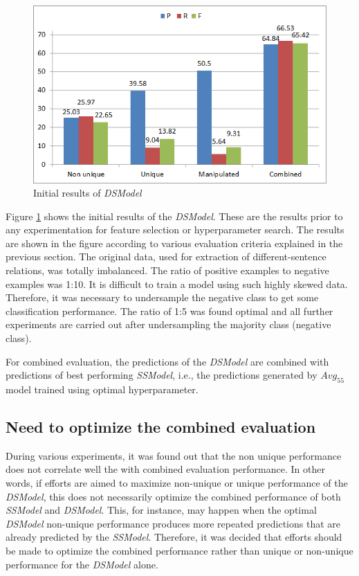 \begin{figure}
\centering
\includegraphics[scale=0.7]{figures/DSInitialResults.png}
\caption{Initial results of \textit{DSModel}}\label{fig:DSInitial}
\end{figure}

Figure \ref{fig:DSInitial} shows the initial results of the \textit{DSModel}. These are the results prior to any experimentation for feature selection or hyperparameter search. The results are shown in the figure according to various evaluation criteria explained in the previous section. The original data, used for extraction of different-sentence relations, was totally imbalanced. The ratio of positive examples to negative examples was 1:10. It is difficult to train a model using such highly skewed data. Therefore, it was necessary to undersample \cite{akbani2004applying} the negative class to get some classification performance. The ratio of 1:5 was found optimal and all further experiments are carried out after undersampling the majority class (negative class).

For combined evaluation, the predictions of the \textit{DSModel} are combined with predictions of best performing \textit{SSModel}, i.e., the predictions generated by $Avg_{55}$ model trained using optimal hyperparameter.

\subsection{Need to optimize the combined evaluation}

During various experiments, it was found out that the non unique performance does not correlate well the with combined evaluation performance. In other words, if efforts are aimed to maximize non-unique or unique performance of the \textit{DSModel}, this does not necessarily optimize the combined performance of both \textit{SSModel} and \textit{DSModel}. This, for instance, may happen when the optimal \textit{DSModel} non-unique performance produces more repeated predictions that are already predicted by the \textit{SSModel}. Therefore, it was decided that efforts should be made to optimize the combined performance rather than unique or non-unique performance for the \textit{DSModel} alone.

